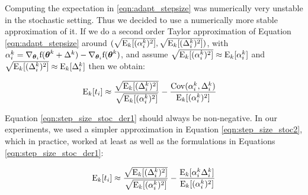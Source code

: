\documentclass{article}
\begin{document}
Computing the expectation in \ref{eqn:adapt_stepsize} was numerically very unstable in the stochastic
setting. Thus we decided to use a numerically more stable approximation of it. If we do a second order Taylor approximation of 
Equation \ref{eqn:adapt_stepsize} around $(\sqrt{\mathrm{E}_k[(\alpha_i^k)^2]}, \sqrt{\mathrm{E}_k[(\Delta_i^k)^2]})$, with $\alpha_i^k = \nabla_{{\boldsymbol{\theta}}_i} \text{f}({\boldsymbol{\theta}}^k + \Delta^k) - \nabla_{{\boldsymbol{\theta}}_i} \text{f}({\boldsymbol{\theta}}^k)$, 
and assume  $\sqrt{\mathrm{E}_k[(\alpha_i^k)^2]} \approx \mathrm{E}_k[\alpha_i^k]$ and $\sqrt{\mathrm{E}_k[(\Delta_i^k)^2]} \approx \mathrm{E}_k[\Delta_i^k]$ then we obtain:

\begin{align}
\label{eqn:step_size_stoc_der1}
& \mathrm{E}_k[t_{i}] \approx \frac{\sqrt{\mathrm{E}_k[(\Delta_i^k)^2]}}{\sqrt{\mathrm{E}_k[(\alpha_i^k)^2]}} -
\frac{\operatorname{Cov}(\alpha_i^k,\Delta_i^k)}{\mathrm{E}_k[(\alpha_i^k)^2]} 
\end{align}

Equation \ref{eqn:step_size_stoc_der1} should always be non-negative. In our experiments, 
we used a simpler approximation in Equation \ref{eqn:step_size_stoc2}, which in practice,
worked at least as well as the formulations in Equations \ref{eqn:step_size_stoc_der1}:

\begin{equation}
\label{eqn:step_size_stoc2}
\mathrm{E}_k[t_{i}] \approx \frac{\sqrt{\mathrm{E}_k[(\Delta_i^k)^2]}}{\sqrt{\mathrm{E}_k[(\alpha_i^k)^2]}} -
\frac{\mathrm{E}_k[\alpha_i^k\Delta_i^k]}{\mathrm{E}_k[(\alpha_i^k)^2]}
\end{equation}


\end{document}
